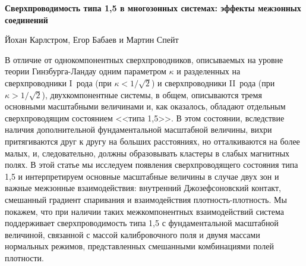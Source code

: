\documentclass[notitlepage,12pt,a4paper]{report}
\begin{document}
  
  \begin{center}
    \begin{minipage}{.8\textwidth} 
    \center  
    \textbf{Сверхпроводимость типа 1,5 в многозонных системах: эффекты 
        межзонных соединений}

    Йохан Карлстром, Егор Бабаев и Мартин Спейт
    \end{minipage}
    
    \bigskip
    \begin{minipage}{.95\textwidth}      
      \hspace{2em} В отличие от однокомпонентных сверхпроводников, описываемых 
      на уровне теории Гинзбурга-Ландау одним параметром \( \kappa \) и 
      разделенных на сверхпроводники I~рода (при \( \kappa < 1/\sqrt{2} \)) и
      сверхпроводники II~рода (при \( \kappa > 1/\sqrt{2} \)),
      двух\-ком\-по\-нент\-ные системы, в общем, описываются тремя основными
      масштабными величинами и, как оказалось, обладают отдельным сверхпроводящим
      состоянием <<типа 1,5>>\cite{bib:1,bib:2}. В этом состоянии, вследствие 
      наличия дополнительной фундаментальной масштабной величины, вихри 
      притягиваются друг к другу на больших расстояниях, но отталкиваются на 
      более малых, и, следовательно, должны образовывать кластеры в слабых 
      магнитных полях. В этой статье мы исследуем появления сверхпроводящего 
      состояния типа 1,5 и интерпретируем основные масштабные величины в 
      случае двух зон и важные межзонные взаимодействия: внутренний 
      Джозефсоновский контакт, смешанный градиент спаривания и взаимодействия 
      плотность-плотность. Мы покажем, что при наличии таких межкомпонентных 
      взаимодействий система поддерживает сверхпроводимость типа 1,5 с 
      фундаментальной масштабной величиной, связанной с массой калибровочного 
      поля и двумя массами нормальных режимов, представленных смешанными 
      комбинациями полей плотности.
    \end{minipage}
  \end{center}
  
   \newpage
   \newpage
   \newpage
   \newpage
   \newpage
  \begin{appendix}
     \newpage
     \newpage
     \newpage
  \end{appendix}
  
\end{document}
